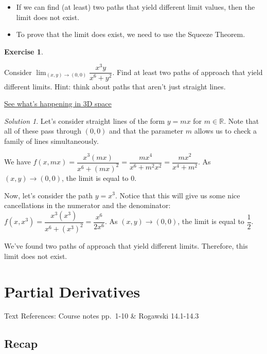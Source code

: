 \documentclass[
]{book}
\providecommand{\tightlist}{%
  \setlength{\itemsep}{0pt}\setlength{\parskip}{0pt}}
\theoremstyle{definition}
\theoremstyle{definition}
\theoremstyle{definition}
\newtheorem{exercise}{Exercise}[chapter]
\theoremstyle{definition}
\theoremstyle{remark}
\newtheorem*{solution}{Solution}
\begin{document}
\begin{itemize}
\tightlist
\item
  If we can find (at least) two paths that yield different limit values, then the limit does not exist.
\item
  To prove that the limit does exist, we need to use the Squeeze Theorem.
\end{itemize}

\begin{exercise}
\protect\hypertarget{exr:unlabeled-div-10}{}\label{exr:unlabeled-div-10}

Consider \(\displaystyle \lim_{(x,y)\to(0,0)} \dfrac{x^3y}{x^6+y^2}\). Find at least two paths of approach that yield different limits. Hint: think about paths that aren't just straight lines.

\href{https://www.geogebra.org/m/rcrgqzqu}{See what's happening in 3D space}

\end{exercise}

\begin{solution}

Let's consider straight lines of the form \(y=mx\) for \(m\in\mathbb{R}\). Note that all of these pass through \((0,0)\) and that the parameter \(m\) allows us to check a family of lines simultaneously.

We have \(f(x,mx) = \dfrac{x^3(mx)}{x^6+(mx)^2} = \dfrac{mx^4}{x^6+m^2x^2}=\dfrac{mx^2}{x^4+m^2}\). As \((x,y)\to(0,0)\), the limit is equal to \(0\).

Now, let's consider the path \(y=x^3\). Notice that this will give us some nice cancellations in the numerator and the denominator: \(f(x,x^3)=\dfrac{x^3(x^3)}{x^6+(x^3)^2}=\dfrac{x^6}{2x^6}\). As \((x,y)\to(0,0)\), the limit is equal to \(\dfrac{1}{2}\).

We've found two paths of approach that yield different limits. Therefore, this limit does not exist.

\end{solution}

\hypertarget{lec-3}{%
\chapter{Partial Derivatives}\label{lec-3}}

Text References: Course notes pp.~1-10 \& Rogawski 14.1-14.3

\hypertarget{recap-1}{%
\section{Recap}\label{recap-1}}
\end{document}
